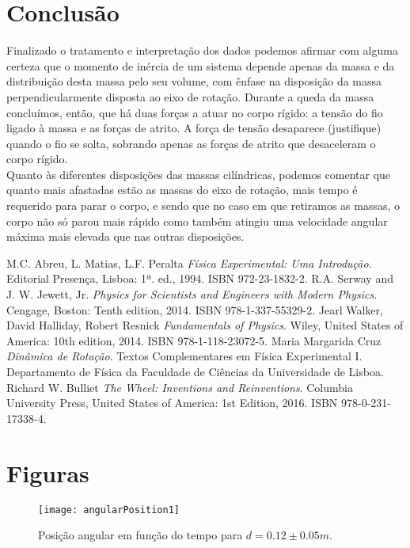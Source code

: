 \documentclass[11pt]{report}
\begin{document}
\chapter{Conclusão}
Finalizado o tratamento e interpretação dos dados podemos afirmar com alguma certeza que o momento de inércia de um sistema depende apenas da massa e da distribuição desta massa pelo seu volume, com ênfase na disposição da massa perpendicularmente disposta ao eixo de rotação. Durante a queda da massa concluímos, então, que há duas forças a atuar no corpo rígido: a tensão do fio ligado à massa e as forças de atrito. A força de tensão desaparece (justifique) quando o fio se solta, sobrando apenas as forças de atrito que desaceleram o corpo rígido.\\
Quanto às diferentes disposições das massas cilíndricas, podemos comentar que quanto mais afastadas estão as massas do eixo de rotação, mais tempo é requerido para parar o corpo, e sendo que no caso em que retiramos as massas, o corpo não só parou mais rápido como também atingiu uma velocidade angular máxima mais elevada que nas outras disposições.
\begin{thebibliography}{1}

   M.C. Abreu, L. Matias, L.F. Peralta {\it Física Experimental: Uma Introdução}. Editorial Presença, Lisboa: 1ª. ed., 1994. ISBN 972-23-1832-2.
   R.A. Serway and J. W. Jewett, Jr. {\it Physics for Scientists and Engineers with Modern Physics}. Cengage, Boston: Tenth edition, 2014. ISBN 978-1-337-55329-2.
   Jearl Walker, David Halliday, Robert Resnick {\it Fundamentals of Physics}. Wiley, United States of America: 10th edition, 2014. ISBN 978-1-118-23072-5.
   Maria Margarida Cruz {\it Dinâmica de Rotação}. Textos Complementares em Física Experimental I. Departamento de Física da Faculdade de Ciências da Universidade de Lisboa.
   Richard W. Bulliet {\it 
The Wheel: Inventions and Reinventions}. Columbia University Press, United States of America: 1st Edition, 2016. ISBN 978-0-231-17338-4.



\end{thebibliography}
\appendix
\chapter{Figuras}
\begin{figure} [H]
\center
\texttt{[image: angularPosition1]}
\caption{Posição angular em função do tempo para $d=0.12\pm0.05 m $.}
\end{figure}
\end{document}
